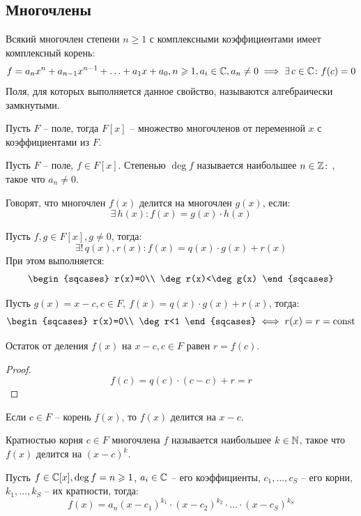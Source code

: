 \documentclass[12pt]{article}
\begin{document}
\subsection{Многочлены}

\begin{theorem}
	Всякий многочлен степени $n\geqslant1$ с комплексными коэффициентами
	имеет комплексный корень:
	\[f=a_nx^n+a_{n-1}x^{n-1}+\ldots+a_1x+a_0, n\geqslant1, a_i\in\mathbb{C},
	a_n\neq0\implies \exists\,c\in\mathbb{C}\colon f(c)=0\]
	Поля, для которых выполняется данное свойство, называются
	алгебраически замкнутыми.
\end{theorem}
\begin{definition}
	Пусть $F$ -- поле, тогда $F[x]$ -- множество многочленов от
	переменной $x$ с коэффициентами из $F$.
\end{definition}
\begin{definition}
	Пусть $F$ -- поле, $f\in F[x]$. Степенью $\deg f$ называется
	наибольшее $n\in\mathbb{Z}\colon$, такое что $a_n\neq0$.
\end{definition}
\begin{definition}
	Говорят, что многочлен $f(x)$ делится на многочлен $g(x)$, если:
	\[\exists\,h(x)\colon f(x)=g(x)\cdot h(x)\]
\end{definition}
\begin{theorem}
	Пусть $f, g\in F[x], g\neq0$, тогда:
	\[\exists!\,q(x), r(x)\colon f(x)=q(x)\cdot g(x)+r(x)\]
	При этом выполняется:
	\[
		\begin{sqcases}
			r(x)=0\\
			\deg r(x)<\deg g(x)
	\end{sqcases}\]
\end{theorem}
\begin{consequence}
	Пусть $g(x)=x-c, c\in F,\ f(x)=q(x)\cdot g(x)+r(x)$, тогда:
	\[
		\begin{sqcases}
			r(x)=0\\
			\deg r<1
	\end{sqcases}\iff r(x)=r=\const\]
\end{consequence}
\begin{theorem}[Безу]
	Остаток от деления $f(x)$ на $x-c, c\in F$ равен $r=f(c)$.
	\begin{proof}
		\[f(c)=q(c)\cdot(c-c)+r=r\]
	\end{proof}
\end{theorem}
\begin{consequence}
	Если $c\in F$ -- корень $f(x)$, то $f(x)$ делится на $x-c$.
\end{consequence}
\begin{definition}
	Кратностью корня $c\in F$ многочлена $f$ называется наибольшее
	$k\in\mathbb{N}$, такое что $f(x)$ делится на $(x-c)^k$.
\end{definition}
\begin{statement}
	Пусть $f\in\mathbb{C}[x], \deg f=n\geqslant1$, $a_i\in\mathbb{C}$ -- его
	коэффициенты, $c_1,\ldots,c_S$ -- его корни, $k_1,\ldots, k_S$ -- их
	кратности, тогда:
	\[f(x)=a_n(x-c_1)^{k_1}\cdot (x-c_2)^{k_2}\cdot\ldots\cdot (x-c_S)^{k_S}\]
\end{statement}
\end{document}
